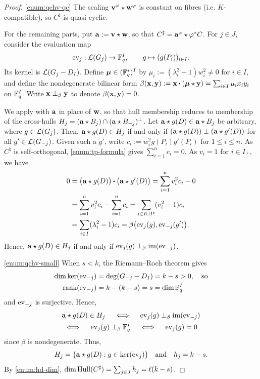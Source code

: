\documentclass[twocolumn, 11pt]{scrartcl}
\begin{document}
\begin{proof}
    \ref{enum:qchv-qc} The scaling $\mathbf{v}^\varphi\star\mathbf{w}^\varphi$ is constant on fibres (i.e. $K$-compatible), so $C^\sharp$ is quasi-cyclic.

    For the remaining parts, put $\mathbf{a}:=\mathbf{v}\star\mathbf{w}$, so that $C^\sharp=\mathbf{a}^\varphi\star\varphi^*C$. For $j\in J$, consider the evaluation map
    \[ \operatorname{ev}_j:\mathcal{L}(G_j)\to\mathbb{F}_q^I,\qquad g\mapsto(g(P_i))_{i\in I}. \]
    Its kernel is $\mathcal{L}(G_j-D_I)$. Define $\boldsymbol\mu\in(\mathbb{F}_q^*)^I$ by $\mu_i:=(\lambda_i^2-1)w_i^2\neq0$ for $i\in I$, and define the nondegenerate bilinear form $\beta(\bfx,\bfy):=\bfx\dotpr(\bm\mu\star\bfy)=\sum_{i\in I}\mu_ix_iy_i$ on $\mathbb{F}_q^I$. Write $\mathbf{x}\perp_\beta\mathbf{y}$ to denote $\beta(\mathbf{x},\mathbf{y})=0$.

    We apply  with $\mathbf{a}$ in place of $\mathbf{w}$, so that hull membership reduces to membership of the cross-hulls $H_j=(\mathbf{a}\star B_j)\cap(\mathbf{a}\star B_{-j})^\perp$. Let $\mathbf{a}\star g(D)\in\mathbf{a}\star B_j$ be arbitrary, where $g\in\mathcal{L}(G_j)$. Then, $\mathbf{a}\star g(D)\in H_j$ if and only if $(\mathbf{a}\star g(D))\perp(\mathbf{a}\star g'(D))$ for all $g'\in\mathcal{L}(G_{-j})$. Given such a $g'$, write $c_i:=w_i^2 g(P_i)g'(P_i)$ for $1\leq i\leq n$. As $C^\natural$ is self-orthogonal, \ref{enum:tp-formula} gives $\sum_{i=1}^n c_i=0$. As $v_i=1$ for $i\in I\comp$, we have
    \begin{align*}
        0&=\pa[\big]{\bfa\star g(D)}\dotpr\pa[\big]{\bfa\star g'(D)}=\sum_{i=1}^n v_i^2 c_i-0 \\
        &=\sum_{i=1}^n v_i^2 c_i-\sum_{i=1}^n c_i=\sum_{i\in I\sqcup I\comp} (v_i^2-1) c_i \\
        &=\sum_{i\in I} (\lambda_i^2-1) c_i= \beta\pa[\big]{\ev_j(g),\ev_{-j}(g')}.
    \end{align*}
    Hence, $\mathbf{a}\star g(D)\in H_j$ if and only if $\operatorname{ev}_j(g)\perp_\beta\operatorname{im}(\operatorname{ev}_{-j})$.

    \ref{enum:qchv-small} When $s<k$, the Riemann--Roch theorem gives
    \begin{align*}
        \dim\ker(\operatorname{ev}_{-j})&=\deg(G_{-j}-D_I)=k-s>0,\quad\text{so} \\
        \operatorname{rank}(\operatorname{ev}_{-j})&=k-(k-s)=s=\dim\mathbb{F}_q^I
    \end{align*}
    and $\operatorname{ev}_{-j}$ is surjective. Hence,
    \begin{gather*}
        \mathbf{a}\star g(D)\in H_j \quad\iff\quad \operatorname{ev}_j(g) \perp_\beta \operatorname{im}(\operatorname{ev}_{-j}) \\
        \iff\quad \operatorname{ev}_j(g) \perp_\beta \mathbb{F}_q^I 
        \quad\iff\quad \operatorname{ev}_j(g)=0
    \end{gather*}
    since $\beta$ is nondegenerate. Thus,
    \[ H_j=\{\mathbf{a}\star g(D):g\in\ker(\operatorname{ev}_j)\}\quad\text{and}\quad h_j=k-s.\]
    By \ref{enum:hd-dim}, $\dim\operatorname{Hull}(C^\sharp)=\sum_{j\in J}h_j=\ell(k-s)$.


\end{proof}
\end{document}
